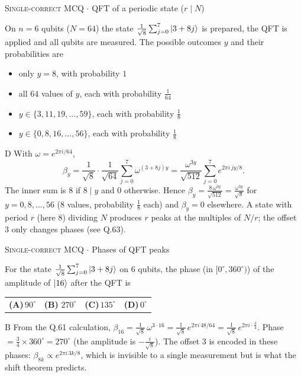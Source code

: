 \documentclass[11pt,a4paper]{article}
\newcommand{\optlabel}[1]{\textbf{(#1)}}
\newcommand{\correctlabel}[1]{\textcolor{okgreen}{\textbf{(#1)}\,\ding{51}}}
\newenvironment{qitem}[1]{\begin{list}{}{\setlength{\leftmargin}{3.3em}\setlength{\labelwidth}{3.1em}%
  \setlength{\labelsep}{0.2em}\setlength{\topsep}{3pt}\setlength{\parsep}{3pt}}\item[\textbf{Q.#1}\hfill]}{\end{list}}
\newcommand{\qsep}{\par\vspace{2pt}{\color{black!15}\hrule}\vspace{4pt}}
\newcommand{\qmeta}[2]{{\footnotesize\color{black!60}\textsc{#1} \;$\cdot$\; #2}\par}
\begin{document}
\begin{qitem}{61}
\qmeta{Single-correct MCQ}{QFT of a periodic state ($r\mid N$)}
On $n = 6$ qubits ($N = 64$) the state $\frac{1}{\sqrt8}\sum_{j=0}^{7}\ket{3 + 8j}$ is prepared, the QFT is applied and all
qubits are measured. The possible outcomes $y$ and their probabilities are
\begin{itemize}[leftmargin=2.6em, labelsep=0.4em, itemsep=2pt, topsep=3pt]
\item[\optlabel{A}] only $y = 8$, with probability $1$
\item[\optlabel{B}] all $64$ values of $y$, each with probability $\frac{1}{64}$
\item[\optlabel{C}] $y \in \{3, 11, 19, \dots, 59\}$, each with probability $\frac18$
\item[\correctlabel{D}] $y \in \{0, 8, 16, \dots, 56\}$, each with probability $\frac18$
\end{itemize}
\end{qitem}
\begin{solbox}{D}
With $\omega = e^{2\pi i/64}$,
\[ \beta_y = \frac{1}{\sqrt8}\cdot\frac{1}{\sqrt{64}}\sum_{j=0}^{7}\omega^{(3+8j)y} = \frac{\omega^{3y}}{\sqrt{512}}\sum_{j=0}^{7} e^{2\pi i\,jy/8}. \]
The inner sum is $8$ if $8 \mid y$ and $0$ otherwise. Hence $\beta_y = \frac{8\,\omega^{3y}}{\sqrt{512}} = \frac{\omega^{3y}}{\sqrt8}$ for
$y = 0, 8, \dots, 56$ (8 values, probability $\frac18$ each) and $\beta_y = 0$ elsewhere. A state with period $r$ (here $8$)
dividing $N$ produces $r$ peaks at the multiples of $N/r$; the offset $3$ only changes phases (see Q.63).
\end{solbox}
\qsep

\begin{qitem}{62}
\qmeta{Single-correct MCQ}{Phases of QFT peaks}
For the state $\frac{1}{\sqrt8}\sum_{j=0}^{7}\ket{3 + 8j}$ on $6$ qubits, the phase (in $[0^\circ, 360^\circ)$) of the amplitude of
$\ket{16}$ after the QFT is
\par\smallskip\noindent\begin{tabularx}{\linewidth}{@{}*{4}{L}@{}}
\optlabel{A}\,$90^\circ$ & \correctlabel{B}\,$270^\circ$ & \optlabel{C}\,$135^\circ$ & \optlabel{D}\,$0^\circ$
\end{tabularx}
\end{qitem}
\begin{solbox}{B}
From the Q.61 calculation, $\beta_{16} = \frac{1}{\sqrt8}\,\omega^{3\cdot16} = \frac{1}{\sqrt8}\,e^{2\pi i\,48/64} = \frac{1}{\sqrt8}\,e^{2\pi i\cdot\frac34}$.
Phase $= \frac34\times360^\circ = 270^\circ$ (the amplitude is $-\frac{i}{\sqrt8}$). The offset $3$ is encoded in these phases:
$\beta_{8k} \propto e^{2\pi i\,3k/8}$, which is invisible to a single measurement but is what the shift theorem predicts.
\end{solbox}
\qsep
\end{document}
